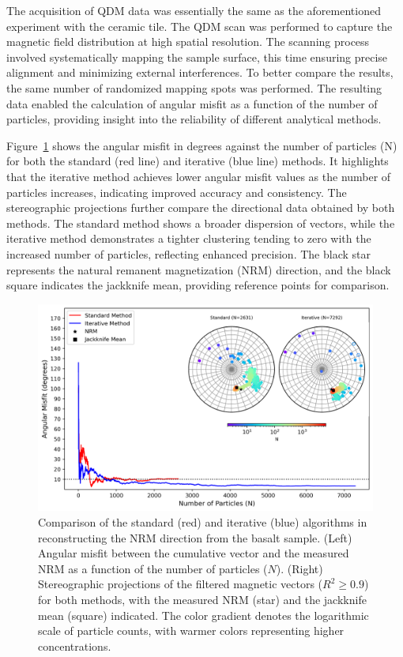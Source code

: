 The acquisition of QDM data was essentially the same as the aforementioned experiment with the ceramic tile. The QDM scan was performed to capture the magnetic field distribution at high spatial resolution. The scanning process involved systematically mapping the sample surface, this time ensuring precise alignment and minimizing external interferences. To better compare the results, the same number of randomized mapping spots was performed. The resulting data enabled the calculation of angular misfit as a function of the number of particles, providing insight into the reliability of different analytical methods.

Figure~\ref{basalt-data-stereograms} shows the angular misfit in degrees against the number of particles (N) for both the standard (red line) and iterative (blue line) methods. It highlights that the iterative method achieves lower angular misfit values as the number of particles increases, indicating improved accuracy and consistency. The stereographic projections further compare the directional data obtained by both methods. The standard method shows a broader dispersion of vectors, while the iterative method demonstrates a tighter clustering tending to zero with the increased number of particles, reflecting enhanced precision. The black star represents the natural remanent magnetization (NRM) direction, and the black square indicates the jackknife mean, providing reference points for comparison.

\begin{figure}[tb!]
  \centering
  \includegraphics[width=1\linewidth]{paper/figures/basalt-data-stereoplot.png}
  \caption{
  Comparison of the standard (red) and iterative (blue) algorithms in reconstructing the NRM direction from the basalt sample. (Left) Angular misfit between the cumulative vector and the measured NRM as a function of the number of particles ($N$). (Right) Stereographic projections of the filtered magnetic vectors ($R^2 \geq 0.9$) for both methods, with the measured NRM (star) and the jackknife mean (square) indicated. The color gradient denotes the logarithmic scale of particle counts, with warmer colors representing higher concentrations.
  }
  \label{basalt-data-stereograms}
\end{figure}


